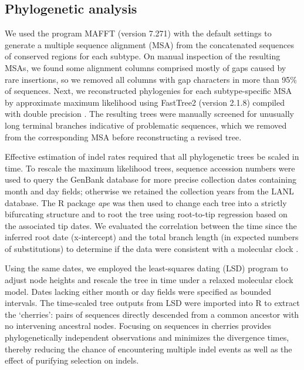\documentclass[12pt]{article}
\begin{document}
\subsection * {Phylogenetic analysis}

We used the program MAFFT (version 7.271) with the default settings \citep{Katoh:2013} to generate a multiple sequence alignment (MSA) from the concatenated sequences of conserved regions for each subtype.
On manual inspection of the resulting MSAs, we found some alignment columns comprised mostly of gaps caused by rare insertions, so we removed all columns with gap characters in more than 95\% of sequences.
Next, we reconstructed phylogenies for each subtype-specific MSA by approximate maximum likelihood using FastTree2 (version 2.1.8) compiled with double precision \citep{Price:2010}.
The resulting trees were manually screened for unusually long terminal branches indicative of problematic sequences, which we removed from the corresponding MSA before reconstructing a revised tree.

Effective estimation of indel rates required that all phylogenetic trees be scaled in time. 
To rescale the maximum likelihood trees, sequence accession numbers were used to query the GenBank database for more precise collection dates containing month and day fields; otherwise we retained the collection years from the LANL database. 
The R package \textit{ape} was then used to change each tree into a strictly bifurcating structure and to root the tree using root-to-tip regression \citep{Paradis:2004} based on the associated tip dates.
We evaluated the correlation between the time since the inferred root date (x-intercept) and the total branch length (in expected numbers of substitutions) to determine if the data were consistent with a molecular clock \citep{drummond2003inference}.

Using the same dates, we employed the least-squares dating (LSD) program \citep{To:2015} to adjust node heights and rescale the tree in time under a relaxed molecular clock model. 
Dates lacking either month or day fields were specified as bounded intervals. 
The time-scaled tree outputs from LSD were imported into R to extract the `cherries': pairs of sequences directly descended from a common ancestor with no intervening ancestral nodes. 
Focusing on sequences in cherries provides phylogenetically independent observations and minimizes the divergence times, thereby reducing the chance of encountering multiple indel events as well as the effect of purifying selection on indels.
\end{document}
